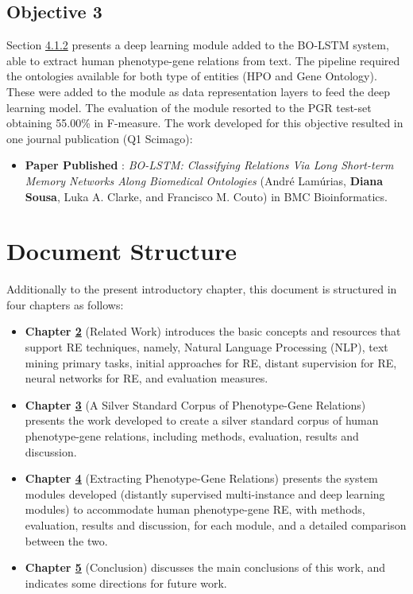 
\subsection{Objective 3}

Section \hyperlink{4.1.2}{4.1.2} presents a deep learning module added to the BO-LSTM system, able to extract human phenotype-gene relations from text. The pipeline required the ontologies available for both type of entities (HPO and Gene Ontology). These were added to the module as data representation layers to feed the deep learning model. The evaluation of the module resorted to the PGR test-set obtaining 55.00\% in F-measure. The work developed for this objective resulted in one journal publication (Q1 Scimago):

\begin{itemize}
    \item{\textbf{Paper Published} \citep{BOLSTM}: \textit{BO-LSTM: Classifying Relations Via Long
    Short-term Memory Networks Along Biomedical Ontologies} (André Lamúrias, \textbf{Diana Sousa}, Luka A. Clarke, and Francisco M. Couto) in BMC Bioinformatics.}
\end{itemize}


\section{Document Structure}

Additionally to the present introductory chapter, this document is structured in four chapters as follows:

\begin{itemize}
   \item \textbf{Chapter \hyperlink{2}{2}} (Related Work) introduces the basic concepts and resources that support RE techniques, namely, Natural Language Processing (NLP), text mining primary tasks, initial approaches for RE, distant supervision for RE, neural networks for RE, and evaluation measures.
   \item \textbf{Chapter \hyperlink{3}{3}} (A Silver Standard Corpus of Phenotype-Gene Relations) presents the work developed to create a silver standard corpus of human phenotype-gene relations, including methods, evaluation, results and discussion.
   \item \textbf{Chapter \hyperlink{4}{4}} (Extracting Phenotype-Gene Relations) presents the system modules developed (distantly supervised multi-instance and deep learning modules) to accommodate human phenotype-gene RE, with methods, evaluation, results and discussion, for each module, and a detailed comparison between the two.
   \item \textbf{Chapter \hyperlink{5}{5}} (Conclusion) discusses the main conclusions of this work, and indicates some directions for future work.
\end{itemize}